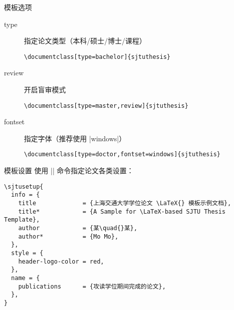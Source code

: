 \begin{frame}[fragile]{模板选项}
  \begin{description}
    \item[type] 指定论文类型（本科/硕士/博士/课程）
      \begin{lstlisting}[basicstyle=\ttfamily]
\documentclass[type=bachelor]{sjtuthesis}
  \end{lstlisting}
    \item[review] 开启盲审模式
      \begin{lstlisting}[basicstyle=\ttfamily]
\documentclass[type=master,review]{sjtuthesis}
  \end{lstlisting}
    \item[fontset] 指定字体（推荐使用 |windows|）
      \begin{lstlisting}[basicstyle=\ttfamily]
\documentclass[type=doctor,fontset=windows]{sjtuthesis}
  \end{lstlisting}
  \end{description}
\end{frame}

\begin{frame}[fragile]{模板设置}
  使用 |\sjtusetup| 命令指定论文各类设置：
  \begin{lstlisting}
\sjtusetup{
  info = {
    title             = {上海交通大学学位论文 \LaTeX{} 模板示例文档},
    title*            = {A Sample for \LaTeX-based SJTU Thesis Template},
    author            = {某\quad{}某},
    author*           = {Mo Mo},
  },
  style = {
    header-logo-color = red,
  },
  name = {
    publications      = {攻读学位期间完成的论文},
  },
}
  \end{lstlisting}
\end{frame}


